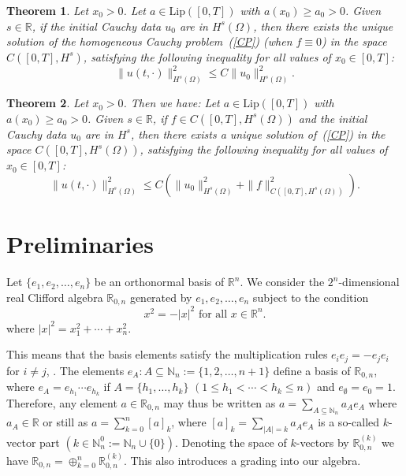 \documentclass[12pt]{amsart}
\newtheorem{theorem}{Theorem}[section]
\theoremstyle{definition}
\newcommand{\R}{\mathbb{R}}
\newcommand{\N}{\mathbb{N}}
\newcommand{\inci}{\subseteq}
\begin{document}
\begin{theorem}
\label{th1.1}
Let \(x_0 > 0\). Let \(a \in \mathrm{Lip}([0, T])\) with \(a(x_0) \geq a_0 > 0\). Given \(s \in \mathbb{R}\), if the initial Cauchy data \(u_0\) are in \(H^{s}(\Omega)\), then there exists the unique solution of the homogeneous Cauchy problem~(\ref{CP}) (when \(f \equiv 0\)) in the space \(C([0, T], H^{s})\), satisfying the following inequality for all values of \(x_0 \in [0, T]\):
    \begin{equation*}
    \label{eq:1.5}
          \| u(t, \cdot) \|_{H^s(\Omega)}^2  \leq C \| u_0 \|_{H^s(\Omega)}^2 .
    \end{equation*}
\end{theorem}

\begin{theorem}
\label{th1.2}
Let \(x_0 > 0\). Then we have:
Let \(a \in \mathrm{Lip}([0, T])\) with \(a(x_0) \geq a_0 > 0\). Given \(s \in \mathbb{R}\), if \(f \in C([0, T], H^{s}(\Omega))\) and the initial Cauchy data \(u_0\) are in \(H^s\), then there exists a unique solution of~(\ref{CP}) in the space \(C([0, T], H^s(\Omega))\), satisfying the following inequality for all values of \(x_0 \in [0, T]\):
    \begin{equation}
    \label{eq:1.6}
    \| u(t, \cdot) \|_{H^s(\Omega)}^2  \leq C\left(\| u_0 \|_{H^s(\Omega)}^2+\| f\|_{C([0, T], H^{s}(\Omega))}^2\right).
   \end{equation}
\end{theorem}

\section{Preliminaries}

Let $\{e_1,e_2,\ldots,e_n\}$ be an orthonormal basis of $\R^n$. We consider the $2^n$-dimensional real Clifford algebra $\R_{0,n}$ generated by $e_1,e_2,\ldots,e_n$ subject to the condition 
$$
x^2=-|x|^2 \mbox{ for all } x\in\mathbb{R}^n.
$$
where $|x|^2=x_1^2+\cdots +x_n^2$. 

This means that the basis elements satisfy the multiplication rules $e_ie_j=-e_je_i$ for $i\neq j$, . The elements $e_A : A\subseteq \N_n:=\{1,2,\ldots, n+1\}$ define a basis of $\R_{0,n}$, where $e_A=e_{h_1}\cdots e_{h_k}$ if $A=\{h_1, \ldots,h_k\}$ $(1\leq h_1<\cdots<h_k\leq n)$ and $e_\emptyset=e_0=1$. Therefore, any element $a\in\R_{0,n}$ may thus be written as $a=\sum_{A\inci\N_n}a_Ae_A$ where $a_A\in\R$ or still as $a=\sum_{k=0}^n[a]_k$, where {$[a]_k=\sum_{|A|=k}a_A e_A$} is a so-called $k$-vector part $(k\in\N_n^0:=\N_n\cup\{0\})$. Denoting the space of $k$-vectors by $\R_{0,n}^{(k)}$ we have $\R_{0,n}=\oplus_{k=0}^n\R_{0,n}^{(k)}$. This also introduces a grading into our algebra.
\end{document}
